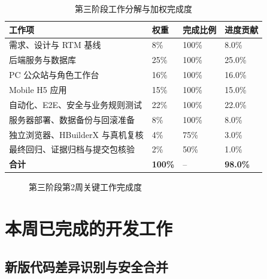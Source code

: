 \documentclass[UTF8,a4paper,zihao=-4,fontset=mac]{ctexart}
\begin{document}
\begin{table}[H]
\centering
\caption{第三阶段工作分解与加权完成度}
\label{tab:weighted-progress}
\begin{tabularx}{\textwidth}{Y C{1.8cm} C{2.2cm} C{2.2cm}}
\toprule
{}\color{white}\bfseries 工作项 & \color{white}\bfseries 权重 & \color{white}\bfseries 完成比例 & \color{white}\bfseries 进度贡献 \\
\midrule
需求、设计与 RTM 基线 & 8\% & 100\% & 8.0\% \\
后端服务与数据库 & 25\% & 100\% & 25.0\% \\
PC 公众站与角色工作台 & 16\% & 100\% & 16.0\% \\
Mobile H5 应用 & 15\% & 100\% & 15.0\% \\
自动化、E2E、安全与业务规则测试 & 22\% & 100\% & 22.0\% \\
服务器部署、数据备份与回滚准备 & 8\% & 100\% & 8.0\% \\
独立浏览器、HBuilderX 与真机复核 & 4\% & 75\% & 3.0\% \\
最终回归、证据归档与提交包核验 & 2\% & 50\% & 1.0\% \\
\midrule
\textbf{合计} & \textbf{100\%} & -- & \textbf{98.0\%} \\
\bottomrule
\end{tabularx}
\end{table}

\begin{figure}[H]
\centering
{}
\caption{第三阶段第2周关键工作完成度}
\label{fig:progress-bars}
\end{figure}

\section{本周已完成的开发工作}

\subsection{新版代码差异识别与安全合并}
\end{document}
